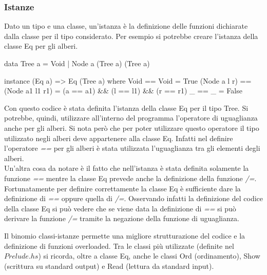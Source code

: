 \subsubsection{Istanze}
Dato un tipo e una classe, un'istanza \`e la definizione delle funzioni dichiarate dalla classe per il tipo considerato. Per esempio 
si potrebbe creare l'istanza della classe Eq per gli alberi.
\begin{haskellCode}
data Tree a = Void | Node a (Tree a) (Tree a)

instance  (Eq a) => Eq (Tree a) where
	Void         == Void            = True
	(Node a l r) == (Node a1 l1 r1) = (a == a1) && 
	                                  (l == l1) && 
	                                  (r == r1)
	_            == _               = False
\end{haskellCode}
Con questo codice \`e stata definita l'istanza della classe Eq per il tipo Tree. Si potrebbe, quindi, utilizzare all'interno del 
programma l'operatore di uguaglianza anche per gli alberi. Si nota per\`o che per poter utilizzare questo operatore il tipo 
utilizzato negli alberi deve appartenere alla classe Eq. Infatti nel definire l'operatore \emph{==} per gli alberi \`e stata utilizzata 
l'uguaglianza tra gli elementi degli alberi.\\
Un'altra cosa da notare \`e il fatto che nell'istanza \`e stata definita solamente la funzione \emph{==} mentre la classe Eq prevede 
anche la definizione della funzione \emph{/=}. Fortunatamente per definire correttamente la classe Eq \`e sufficiente dare la definizione di 
\emph{==} oppure quella di \emph{/=}. Osservando infatti la definizione del codice della classe Eq si pu\`o vedere che se viene data la 
definizione di \emph{==} si pu\`o derivare la funzione \emph{/=} tramite la negazione della funzione di uguaglianza.

Il binomio classi-istanze permette una migliore strutturazione del codice e la definizione di funzioni overloaded. Tra le classi 
pi\`u utilizzate (definite nel $Prelude.hs$) si ricorda, oltre a classe Eq, anche le classi Ord (ordinamento), Show 
(scrittura su standard output) e Read (lettura da standard input).

 
